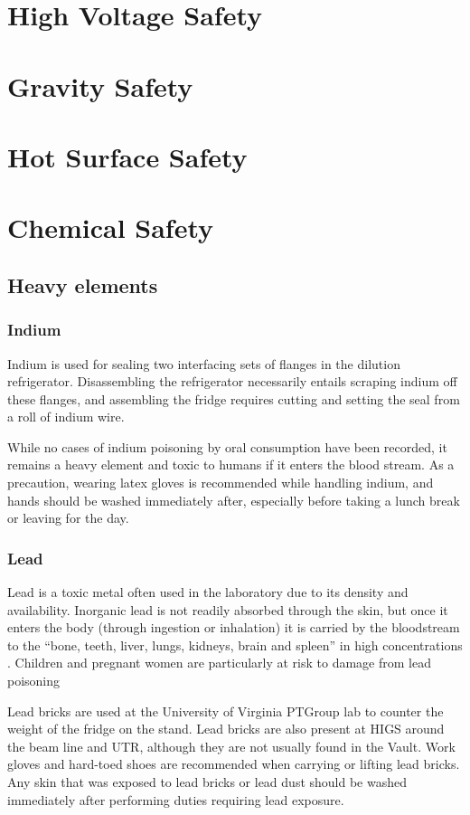 \section{High Voltage Safety}
\section{Gravity Safety}
\section{Hot Surface Safety}
\section{Chemical Safety}
\subsection{Heavy elements}
\subsubsection{Indium}
Indium is used for sealing two interfacing sets of flanges in the dilution refrigerator.  Disassembling the refrigerator necessarily entails scraping indium off these flanges, and assembling the fridge requires cutting and setting the seal from a roll of indium wire.

While no cases of indium poisoning by oral consumption have been recorded, it remains a heavy element and toxic to humans if it enters the blood stream.  As a precaution, wearing latex gloves is recommended while handling indium, and hands should be washed immediately after, especially before taking a lunch break or leaving for the day.

\subsubsection{Lead}
Lead is a toxic metal often used in the laboratory due to its density and availability.  Inorganic lead is not readily absorbed through the skin, but once it enters the body (through ingestion or inhalation) it is carried by the bloodstream to the ``bone, teeth, liver, lungs, kidneys, brain and spleen'' in high concentrations \cite{aafp98}.  Children and pregnant women are particularly at risk to damage from lead poisoning \cite{epa13}


Lead bricks are used at the University of Virginia PTGroup lab to counter the weight of the fridge on the stand.  Lead bricks are also present at HIGS around the beam line and UTR, although they are not usually found in the Vault.  Work gloves and hard-toed shoes are recommended when carrying or lifting lead bricks.  Any skin that was exposed to lead bricks or lead dust should be washed immediately after performing duties requiring lead exposure.

